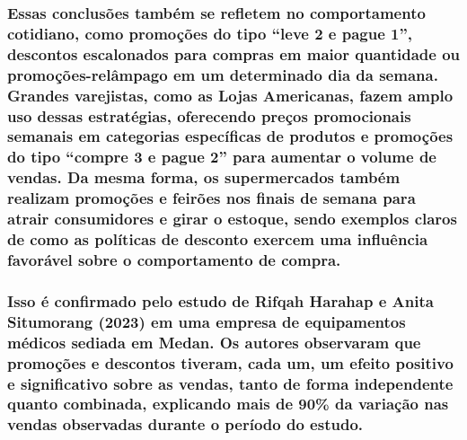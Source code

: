 \documentclass[
]{article}
\begin{document}
\subsubsection{Essas conclusões também se refletem no comportamento
cotidiano, como promoções do tipo ``leve 2 e pague 1'', descontos
escalonados para compras em maior quantidade ou promoções-relâmpago em
um determinado dia da semana. Grandes varejistas, como as Lojas
Americanas, fazem amplo uso dessas estratégias, oferecendo preços
promocionais semanais em categorias específicas de produtos e promoções
do tipo ``compre 3 e pague 2'' para aumentar o volume de vendas. Da
mesma forma, os supermercados também realizam promoções e feirões nos
finais de semana para atrair consumidores e girar o estoque, sendo
exemplos claros de como as políticas de desconto exercem uma influência
favorável sobre o comportamento de
compra.}\label{essas-conclusuxf5es-tambuxe9m-se-refletem-no-comportamento-cotidiano-como-promouxe7uxf5es-do-tipo-leve-2-e-pague-1-descontos-escalonados-para-compras-em-maior-quantidade-ou-promouxe7uxf5es-reluxe2mpago-em-um-determinado-dia-da-semana.-grandes-varejistas-como-as-lojas-americanas-fazem-amplo-uso-dessas-estratuxe9gias-oferecendo-preuxe7os-promocionais-semanais-em-categorias-especuxedficas-de-produtos-e-promouxe7uxf5es-do-tipo-compre-3-e-pague-2-para-aumentar-o-volume-de-vendas.-da-mesma-forma-os-supermercados-tambuxe9m-realizam-promouxe7uxf5es-e-feiruxf5es-nos-finais-de-semana-para-atrair-consumidores-e-girar-o-estoque-sendo-exemplos-claros-de-como-as-poluxedticas-de-desconto-exercem-uma-influuxeancia-favoruxe1vel-sobre-o-comportamento-de-compra.}

\subsubsection{Isso é confirmado pelo estudo de Rifqah Harahap e Anita
Situmorang (2023) em uma empresa de equipamentos médicos sediada em
Medan. Os autores observaram que promoções e descontos tiveram, cada um,
um efeito positivo e significativo sobre as vendas, tanto de forma
independente quanto combinada, explicando mais de 90\% da variação nas
vendas observadas durante o período do
estudo.}\label{isso-uxe9-confirmado-pelo-estudo-de-rifqah-harahap-e-anita-situmorang-2023-em-uma-empresa-de-equipamentos-muxe9dicos-sediada-em-medan.-os-autores-observaram-que-promouxe7uxf5es-e-descontos-tiveram-cada-um-um-efeito-positivo-e-significativo-sobre-as-vendas-tanto-de-forma-independente-quanto-combinada-explicando-mais-de-90-da-variauxe7uxe3o-nas-vendas-observadas-durante-o-peruxedodo-do-estudo.}
\end{document}
